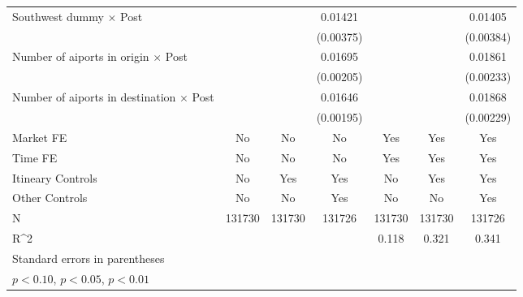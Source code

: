 \begin{table}[htbp]
\begin{tabular}{l*{6}{c}}
\addlinespace
Southwest dummy $\times$ Post&                     &                     &     0.01421\sym{***}&                     &                     &     0.01405\sym{***}\\
                    &                     &                     &   (0.00375)         &                     &                     &   (0.00384)         \\
\addlinespace
Number of aiports in origin $\times$ Post&                     &                     &     0.01695\sym{***}&                     &                     &     0.01861\sym{***}\\
                    &                     &                     &   (0.00205)         &                     &                     &   (0.00233)         \\
\addlinespace
Number of aiports in destination $\times$ Post&                     &                     &     0.01646\sym{***}&                     &                     &     0.01868\sym{***}\\
                    &                     &                     &   (0.00195)         &                     &                     &   (0.00229)         \\
\midrule
Market FE           &          No         &          No         &          No         &         Yes         &         Yes         &         Yes         \\
Time FE             &          No         &          No         &          No         &         Yes         &         Yes         &         Yes         \\
Itineary Controls   &          No         &         Yes         &         Yes         &          No         &         Yes         &         Yes         \\
Other Controls      &          No         &          No         &         Yes         &          No         &          No         &         Yes         \\
N                   &      131730         &      131730         &      131726         &      131730         &      131730         &      131726         \\
R^2                 &                     &                     &                     &       0.118         &       0.321         &       0.341         \\
\bottomrule
\multicolumn{7}{l}{\footnotesize Standard errors in parentheses}\\
\multicolumn{7}{l}{\footnotesize \sym{*} \(p<0.10\), \sym{**} \(p<0.05\), \sym{***} \(p<0.01\)}\\
\end{tabular}
\end{table}
